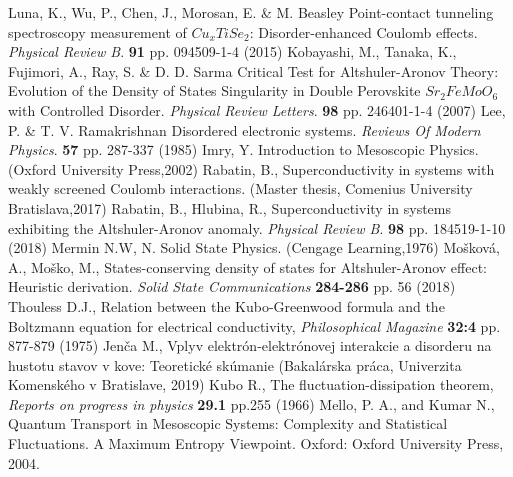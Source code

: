 \begin{thebibliography}{99}
Luna, K., Wu, P., Chen, J., Morosan, E. \& M. Beasley Point-contact tunneling spectroscopy measurement of $Cu_xTiSe_2$: Disorder-enhanced Coulomb effects. {\em Physical Review B}. \textbf{91} pp. 094509-1-4 (2015)
Kobayashi, M., Tanaka, K., Fujimori, A., Ray, S. \& D. D. Sarma Critical Test for Altshuler-Aronov Theory: Evolution of the Density of States Singularity in Double Perovskite $Sr_2FeMoO_6$ with Controlled Disorder. {\em Physical Review Letters}. \textbf{98} pp. 246401-1-4 (2007)
Lee, P. \& T. V. Ramakrishnan Disordered electronic systems. {\em Reviews Of Modern Physics}. \textbf{57} pp. 287-337 (1985)
Imry, Y. Introduction to Mesoscopic Physics. (Oxford University Press,2002)
Rabatin, B., Superconductivity in systems with weakly screened Coulomb interactions. (Master thesis, Comenius University Bratislava,2017)
Rabatin, B., Hlubina, R.,  Superconductivity in systems exhibiting the Altshuler-Aronov anomaly. {\em Physical Review B}.  \textbf{98} pp. 184519-1-10 (2018)
Mermin N.W, N. Solid State Physics. (Cengage Learning,1976)
 Mošková, A., Moško, M.,  States-conserving density of states for Altshuler-Aronov effect: Heuristic derivation. {\em Solid State Communications  }  \textbf{284-286}   pp. 56 (2018)
 Thouless D.J.,  Relation between the Kubo-Greenwood formula and the Boltzmann equation for electrical conductivity, {\em Philosophical Magazine } \textbf{32:4}  pp. 877-879    (1975)
 Jenča M., Vplyv elektrón-elektrónovej interakcie a disorderu na hustotu stavov v kove: Teoretické skúmanie (Bakalárska práca, Univerzita Komenského v Bratislave, 2019)
 Kubo R.,  The fluctuation-dissipation theorem,   {\em Reports on progress in physics } \textbf{29.1} pp.255  (1966)
 Mello, P. A., and Kumar N., Quantum Transport in Mesoscopic Systems: Complexity and Statistical Fluctuations. A Maximum Entropy Viewpoint. Oxford: Oxford University Press, 2004. 
\end{thebibliography}